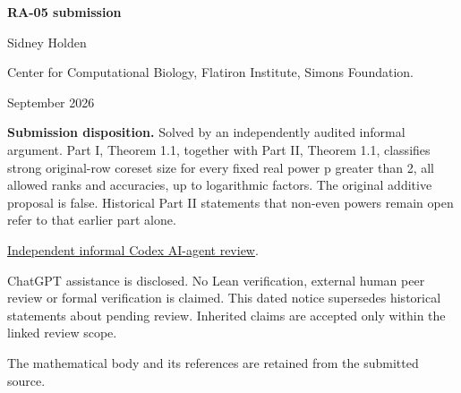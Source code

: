 \documentclass[11pt]{article}
\theoremstyle{remark}\newtheorem{remark}[theorem]{Remark}
\begin{document}
\begin{titlepage}
\thispagestyle{empty}
{\LARGE\bfseries RA-05 submission}\par\bigskip
{\Large Sidney Holden}\par\medskip
Center for Computational Biology, Flatiron Institute, Simons Foundation.\par{} September 2026\par\bigskip
\textbf{Submission disposition.} Solved by an independently audited informal argument. Part I, Theorem 1.1, together with Part II, Theorem 1.1, classifies strong original-row coreset size for every fixed real power p greater than 2, all allowed ranks and accuracies, up to logarithmic factors. The original additive proposal is false. Historical Part II statements that non-even powers remain open refer to that earlier part alone.\par\bigskip
\href{https://github.com/ajt60gaibb/OpenProblemsInNLA/blob/main/reviews/2026-09-14-further-submissions/RA-05-review.md}{Independent informal Codex AI-agent review}.\par\medskip
ChatGPT assistance is disclosed. No Lean verification, external human peer review or formal verification is claimed. This dated notice supersedes historical statements about pending review. Inherited claims are accepted only within the linked review scope.\par\bigskip
The mathematical body and its references are retained from the submitted source.\par
\end{titlepage}
\end{document}
